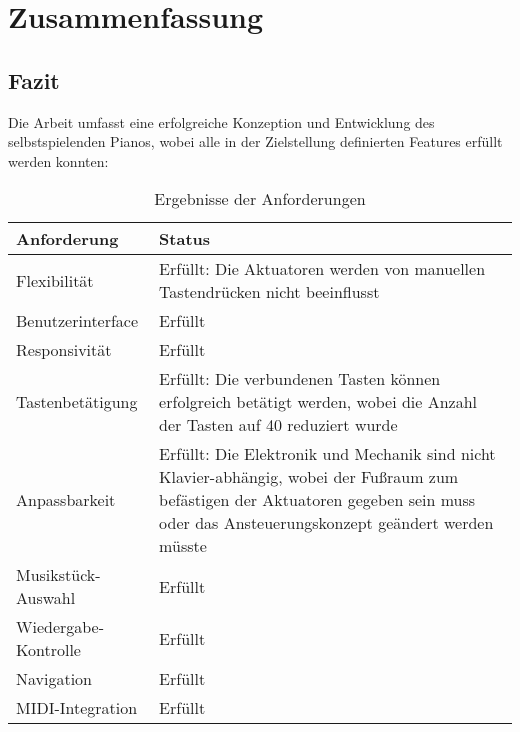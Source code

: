 
\chapter{Zusammenfassung} \label{fazit}
\nocite{*}
\section{Fazit}
Die Arbeit umfasst eine erfolgreiche Konzeption und Entwicklung des selbstspielenden Pianos, wobei alle in der Zielstellung
definierten Features erfüllt werden konnten: \newline

\begin{table}[htbp]
    \centering
    \begin{tabular}{|m{4cm}|m{8cm}|}
        \hline
        \textbf{Anforderung} &  \textbf{Status}  \\
        \hline
        Flexibilität & Erfüllt: Die Aktuatoren werden von manuellen Tastendrücken nicht beeinflusst \\
        \hline
        Benutzerinterface & Erfüllt \\
        \hline
        Responsivität & Erfüllt \\
        \hline
        Tastenbetätigung & Erfüllt: Die verbundenen Tasten können erfolgreich betätigt werden, wobei die Anzahl der Tasten auf
        40 reduziert wurde\\ %
        \hline
        Anpassbarkeit & Erfüllt: Die Elektronik und Mechanik sind nicht Klavier-abhängig, wobei der Fußraum zum befästigen der Aktuatoren
        gegeben sein muss oder das Ansteuerungskonzept geändert werden müsste\\
        \hline
        Musikstück-Auswahl & Erfüllt \\
        \hline
        Wiedergabe-Kontrolle & Erfüllt \\
        \hline
        Navigation & Erfüllt \\
        \hline
        MIDI-Integration & Erfüllt \\
        \hline
    \end{tabular}
    \caption{Ergebnisse der Anforderungen}
    \label{table:anorderungen-ergebnis}
\end{table}


